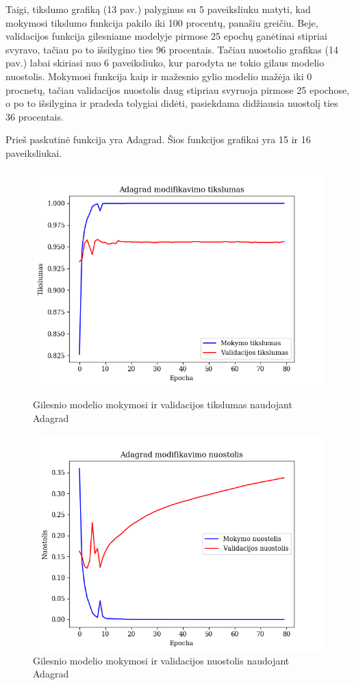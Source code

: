\documentclass{VUMIFPSkursinis}
\begin{document}
Taigi, tikslumo grafiką (13 pav.) palyginus su 5 paveiksliuku matyti, kad mokymosi tikslumo funkcija pakilo iki 100 procentų, panašiu greičiu. Beje, validacijos funkcija gilesniame modelyje pirmose 25 epochų ganėtinai 
stipriai svyravo, tačiau po to išsilygino ties 96 procentais. 
Tačiau nuostolio grafikas (14 pav.) labai skiriasi nuo 6 paveiksliuko, kur parodyta ne tokio gilaus modelio nuostolis. Mokymosi funkcija kaip ir mažesnio gylio modelio mažėja iki 0 procnetų, tačiau validacijos nuostolis 
daug stipriau svyruoja pirmose 25 epochose, o po to išsilygina ir pradeda tolygiai didėti, pasiekdama didžiausia nuostolį ties 36 procentais.

Prieš paskutinė funkcija yra Adagrad. Šios funkcijos grafikai yra 15 ir 16 paveiksliukai.

\begin{figure}[!htbp]
  \centering
  \begin{minipage}[b]{0.49\textwidth}
    \includegraphics[width=\textwidth]{img/AL/Adagrad_acc.png}
    \caption{Gilesnio modelio mokymosi ir validacijos tikslumas naudojant Adagrad}
  \end{minipage}
  \begin{minipage}[b]{0.49\textwidth}
    \includegraphics[width=\textwidth]{img/AL/Adagrad_loss.png}
    \caption{Gilesnio modelio mokymosi ir validacijos nuostolis naudojant Adagrad}
  \end{minipage}
\end{figure}
\end{document}
